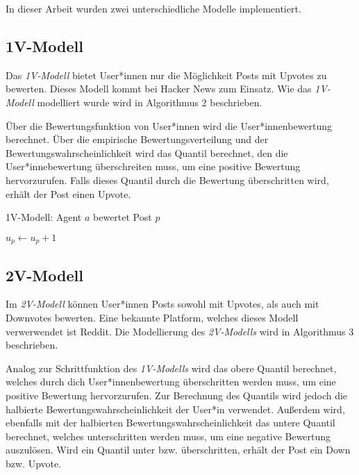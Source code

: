 In dieser Arbeit wurden zwei unterschiedliche Modelle implementiert.

\subsection{1V-Modell}

Das \textit{1V-Modell} bietet User*innen nur die Möglichkeit Posts mit Upvotes zu bewerten. Dieses Modell kommt bei Hacker News zum Einsatz. Wie das \textit{1V-Modell} modelliert wurde wird in Algorithmus 2 beschrieben.

Über die Bewertungsfunktion von User*innen wird die User*innenbewertung berechnet. Über die empirische Bewertungsverteilung und der Bewertungswahrscheinlichkeit wird das Quantil berechnet, den die User*innebewertung überschreiten muss, um eine positive Bewertung hervorzurufen. Falls dieses Quantil durch die Bewertung überschritten wird, erhält der Post einen Upvote.

\begin{algorithm}
	\label{1vschritt}
	\caption{1V-Modell: Agent $a$ bewertet Post $p$}
	\begin{algorithmic}
			\State $u_p \gets u_p + 1$
		\EndIf	
	\end{algorithmic} 
\end{algorithm}


\subsection{2V-Modell}

Im \textit{2V-Modell} können User*innen Posts sowohl mit Upvotes, als auch mit Downvotes bewerten. Eine bekannte Platform, welches dieses Modell verwerwendet ist Reddit. Die Modellierung des \textit{2V-Modells} wird in Algorithmus 3 beschrieben.

Analog zur Schrittfunktion des \textit{1V-Modells} wird das obere Quantil berechnet, welches durch dich User*innenbewertung überschritten werden muss, um eine positive Bewertung hervorzurufen. Zur Berechnung des Quantils wird jedoch die halbierte Bewertungswahrscheinlichkeit der User*in verwendet. Außerdem wird, ebenfalls mit der halbierten Bewertungswahrscheinlichkeit das untere Quantil berechnet, welches unterschritten werden muss, um eine negative Bewertung auszulösen. Wird ein Quantil unter bzw. überschritten, erhält der Post ein Down bzw. Upvote.


